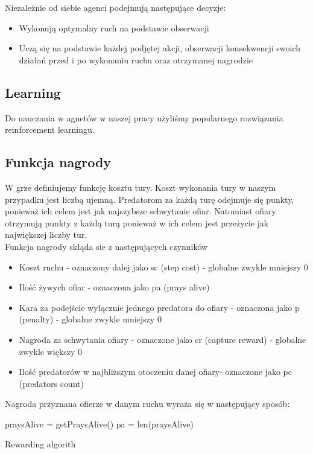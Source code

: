 Niezależnie od siebie agenci podejmują następujące decyzje:
\begin{itemize}
    \item Wykonują optymalny ruch na podstawie obserwacji
    \item Uczą się na podstawie każdej podjętej akcji, obserwacji konsekwencji swoich działań 
          przed i po wykonaniu ruchu oraz otrzymanej nagrodzie
\end{itemize}


\subsection{Learning}
Do nauczania w agnetów w naszej pracy użyliśmy popularnego rozwiązania reinforcement learningu.

\subsection{Funkcja nagrody}
W grze definiujemy funkcję kosztu tury. Koszt wykonania tury w naszym przypadku jest liczbą ujemną. Predatorom
za każdą turę odejmuje się punkty, ponieważ ich celem jest jak najszybsze schwytanie ofiar. Natomiast ofiary otrzymują 
punkty z każdą turą ponieważ w ich celem jest przeżycie jak największej liczby tur.\\

Funkcja nagrody skłąda sie z następujących czynników
\begin{itemize}
    \item Koszt ruchu - oznaczony dalej jako sc (step cost) - globalne zwykle mniejszy 0
    \item Ilość żywych ofiar - oznaczona jako pa (prays alive)
    \item Kara za podejście wyłącznie jednego predatora do ofiary - oznaczona jako p (penalty) - globalne zwykle mniejszy 0 
    \item Nagroda za schwytania ofiary - oznaczone jako cr (capture reward) - globalne zwykle większy 0
    \item Ilość predatorów w najbliższym otoczeniu danej ofiary- oznaczone jako pc (predators count)
\end{itemize}

Nagroda przyznana ofierze w danym ruchu wyraża się w następujący sposób:\\
\begin{algorithm}[H]
 praysAlive = getPraysAlive()\;
 pa = len(praysAlive)\;
 \caption{Rewarding algorith}
\end{algorithm}

